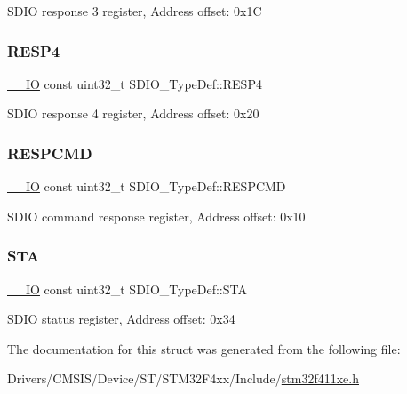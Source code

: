 S\+D\+IO response 3 register, Address offset\+: 0x1C \mbox{\label{struct_s_d_i_o___type_def_a2c4c03d0ead9405bf5b3b3224b36e639}} 
\subsubsection{\texorpdfstring{R\+E\+S\+P4}{RESP4}}
{\footnotesize\ttfamily \hyperlink{core__sc300_8h_aec43007d9998a0a0e01faede4133d6be}{\+\_\+\+\_\+\+IO} const uint32\+\_\+t S\+D\+I\+O\+\_\+\+Type\+Def\+::\+R\+E\+S\+P4}

S\+D\+IO response 4 register, Address offset\+: 0x20 \mbox{\label{struct_s_d_i_o___type_def_ad0076eec3f30c0279c193da7173af543}} 
\subsubsection{\texorpdfstring{R\+E\+S\+P\+C\+MD}{RESPCMD}}
{\footnotesize\ttfamily \hyperlink{core__sc300_8h_aec43007d9998a0a0e01faede4133d6be}{\+\_\+\+\_\+\+IO} const uint32\+\_\+t S\+D\+I\+O\+\_\+\+Type\+Def\+::\+R\+E\+S\+P\+C\+MD}

S\+D\+IO command response register, Address offset\+: 0x10 \mbox{\label{struct_s_d_i_o___type_def_a48171dbf6fb65eba02b912209ef29cce}} 
\subsubsection{\texorpdfstring{S\+TA}{STA}}
{\footnotesize\ttfamily \hyperlink{core__sc300_8h_aec43007d9998a0a0e01faede4133d6be}{\+\_\+\+\_\+\+IO} const uint32\+\_\+t S\+D\+I\+O\+\_\+\+Type\+Def\+::\+S\+TA}

S\+D\+IO status register, Address offset\+: 0x34 

The documentation for this struct was generated from the following file\+:\begin{DoxyCompactItemize}
\item 
Drivers/\+C\+M\+S\+I\+S/\+Device/\+S\+T/\+S\+T\+M32\+F4xx/\+Include/\hyperlink{stm32f411xe_8h}{stm32f411xe.\+h}\end{DoxyCompactItemize}
